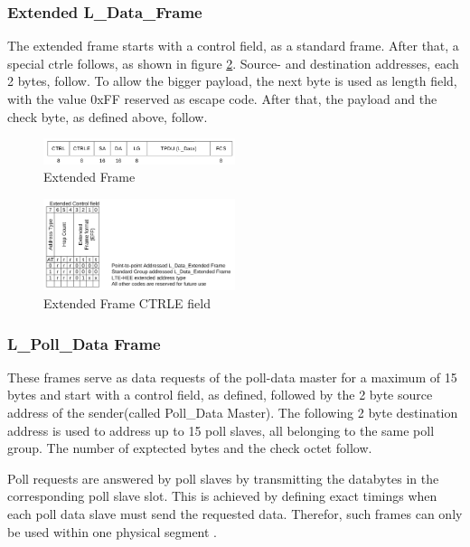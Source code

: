 \subsubsection{Extended L\_Data\_Frame}

The extended frame starts with a control field, as a standard frame. After that, a special \gls{ctrle} follows, as shown in figure \ref{fig:ctrle}.
Source- and destination addresses, each 2 bytes, follow. To allow the bigger payload, the next byte is used as length field, with the value 0xFF reserved
as escape code. After that, the payload and the check byte, as defined above, follow.

\begin{figure}
    \centering
    \includegraphics[width=0.5\textwidth]{figures/extendedframe.png}
    \caption{Extended Frame}
    \label{fig:extframe}
\end{figure}

\begin{figure}
    \centering
    \includegraphics[width=0.5\textwidth]{figures/extendedframeCTRLE.png}
    \caption{Extended Frame CTRLE field}
    \label{fig:ctrle}
\end{figure}

\subsubsection{L\_Poll\_Data Frame}

These frames serve as data requests of the poll-data master for a maximum of 15 bytes
and start with a control field, as defined, followed by the 2 byte source address
of the sender(called Poll\_Data Master). The following 2 byte destination address is 
used to address up to 15 poll slaves, all belonging to the same poll group. The number of
exptected bytes and the check octet follow.

Poll requests are answered by poll slaves by transmitting the databytes in the corresponding poll slave slot.
This is achieved by defining exact timings when each poll data slave must send the requested data. Therefor, such frames can only be used within
one physical segment \cite{knxTP1}.

